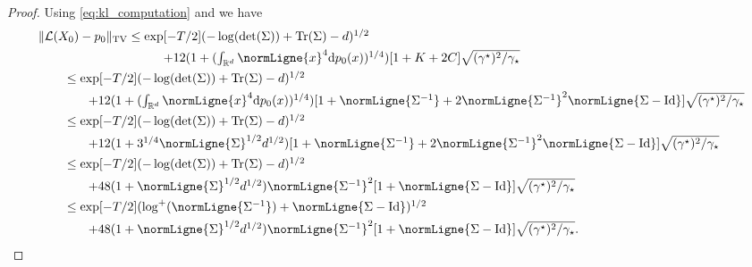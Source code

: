 \begin{proof}
  Using \eqref{eq:kl_computation} and  we have 
  \begin{align}
    &\tvnormLigne{\mathcal{L}(X_0) - p_0} \leq \textstyle{\exp[-T/2] (-\log(\det(\Sigma)) + \mathrm{Tr}(\Sigma) -d)^{1/2}} \\
    & \qquad \qquad \qquad \qquad \qquad   \textstyle{+ 12  (1+(\int_{\rset^d} \normLigne{x}^4 \rmd p_0(x))^{1/4})  [1 +  \Ktt + 2C ]\sqrt{(\gamma^\star)^{2}/\gamma_\star} } \\
    &\qquad \leq \textstyle{\exp[-T/2] (-\log(\det(\Sigma)) + \mathrm{Tr}(\Sigma) -d)^{1/2}} \\
    & \qquad \qquad  \textstyle{+ 12  (1+(\int_{\rset^d} \normLigne{x}^4 \rmd p_0(x))^{1/4})  [1 +  \normLigne{\Sigma^{-1}} + 2\normLigne{\Sigma^{-1}}^2 \normLigne{\Sigma - \Id} ]\sqrt{(\gamma^\star)^{2}/\gamma_\star}  } \\
    &\qquad \leq \textstyle{\exp[-T/2] (-\log(\det(\Sigma)) + \mathrm{Tr}(\Sigma) -d)^{1/2}} \\
    & \qquad \qquad  \textstyle{+ 12  (1+3^{1/4}\normLigne{\Sigma}^{1/2}d^{1/2})  [1 +  \normLigne{\Sigma^{-1}} + 2\normLigne{\Sigma^{-1}}^2 \normLigne{\Sigma - \Id} ]\sqrt{(\gamma^\star)^{2}/\gamma_\star}  } \\
    &\qquad \leq \textstyle{\exp[-T/2] (-\log(\det(\Sigma)) + \mathrm{Tr}(\Sigma) -d)^{1/2}} \\
    & \qquad \qquad  \textstyle{+ 48  (1+\normLigne{\Sigma}^{1/2}d^{1/2}) \normLigne{\Sigma^{-1}}^2 [1 +  \normLigne{\Sigma - \Id} ]\sqrt{(\gamma^\star)^{2}/\gamma_\star}  } \\
    &\qquad \leq \textstyle{\exp[-T/2] (\log^+(\normLigne{\Sigma^{-1}}) + \normLigne{\Sigma - \Id})^{1/2}} \\
    & \qquad \qquad  \textstyle{+ 48  (1+\normLigne{\Sigma}^{1/2}d^{1/2}) \normLigne{\Sigma^{-1}}^2 [1 +  \normLigne{\Sigma - \Id} ]\sqrt{(\gamma^\star)^{2}/\gamma_\star}  .}             
  \end{align}  
\end{proof}


